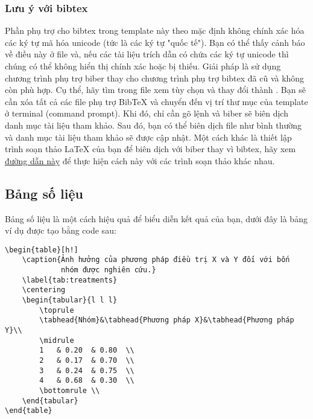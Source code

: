 \subsubsection{Lưu ý với bibtex}

Phần phụ trợ cho bibtex trong template này theo mặc định không chính xác hóa các ký tự mã hóa unicode (tức là các ký tự "quốc tế"). Bạn có thể thấy cảnh báo về điều này ở file  và, nếu các tài liệu trích dẫn có chứa các ký tự unicode thì chúng có thể không hiển thị chính xác hoặc bị thiếu. Giải pháp là sử dụng chương trình phụ trợ biber thay cho chương trình phụ trợ bibtex đã cũ và không còn phù hợp. Cụ thể, hãy tìm trong file  xem tùy chọn  và thay đổi thành . Bạn sẽ cần xóa tất cả các file phụ trợ BibTeX và chuyển đến vị trí thư mục của template ở terminal (command prompt). Khi đó, chỉ cần gõ lệnh  và biber sẽ biên dịch danh mục tài liệu tham khảo. Sau đó, bạn có thể biên dịch file  như bình thường và danh mục tài liệu tham khảo sẽ được cập nhật. Một cách khác là thiết lập trình soạn thảo LaTeX của bạn để biên dịch với biber thay vì bibtex, hãy xem \href{http://tex.stackexchange.com/questions/154751/biblatex-with-biber-configuring-my-editor-to-avoid-undefined-citations/}{đường dẫn này} để thực hiện cách này với các trình soạn thảo khác nhau.


\subsection{Bảng số liệu}

Bảng số liệu là một cách hiệu quả để biểu diễn kết quả của bạn, dưới đây là bảng ví dụ được tạo bằng code sau:
\begin{Verbatim}
\begin{table}[h!]
	\caption{Ảnh hưởng của phương pháp điều trị X và Y đối với bốn 
			 nhóm được nghiên cứu.}
	\label{tab:treatments}
	\centering
	\begin{tabular}{l l l}
		\toprule
		\tabhead{Nhóm}&\tabhead{Phương pháp X}&\tabhead{Phương pháp Y}\\
		\midrule
		1	& 0.20	& 0.80	\\
		2	& 0.17	& 0.70	\\
		3	& 0.24	& 0.75	\\
		4	& 0.68	& 0.30	\\
		\bottomrule	\\
	\end{tabular}
\end{table}
\end{Verbatim}

